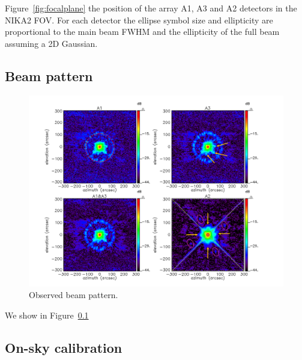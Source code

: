 \documentclass[]{aa} %
\begin{document}
Figure~\ref{fig:focalplane} the position of the array A1, A3 and A2 detectors in the NIKA2 FOV. For each detector the ellipse symbol size and ellipticity
are proportional to the main beam FWHM and the ellipticity of the full beam assuming a 2D Gaussian. 

\subsection{Beam pattern}

\begin{figure}[h]
   \centering
    \includegraphics[width=0.9\linewidth]{Beams_features.pdf}
     
      \caption{Observed beam pattern.}
         \label{fig:beampattern}
\end{figure}

We show in Figure~\ref{}

\subsection{On-sky calibration}
\label{On-sky calibration}
\end{document}
